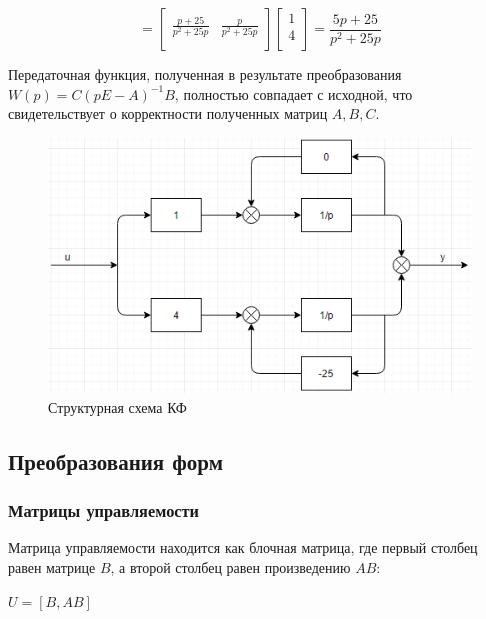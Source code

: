 \documentclass[14pt,a4paper,report]{report}
\begin{document}
\begin{equation*}
\text{$=\begin{bmatrix}
	\frac{p+25}{p^2+25p} & \frac{p}{p^2+25p} \\
	\end{bmatrix}\begin{bmatrix}
	1 \\
	4 \\
	\end{bmatrix}=\frac{5p+25}{p^2+25p}
	$}
\end{equation*}

Передаточная функция, полученная в результате преобразования $W(p)=C(pE-A)^{-1}B$, полностью совпадает с исходной, что свидетельствует о корректности полученных матриц  $A, B, C$. 


\begin{figure}[h!]
	\centering
	\includegraphics[scale = 0.67]{images/kf.png}
	\caption{Структурная схема КФ}
	\label{image:3}
\end{figure}

\subsection{Преобразования форм}

\subsubsection{Матрицы управляемости}

Матрица управляемости находится как блочная матрица, где первый столбец равен матрице $B$, а второй столбец равен произведению $AB$:

\begin{center}
$U=[B, AB]$
\end{center}
\end{document}
